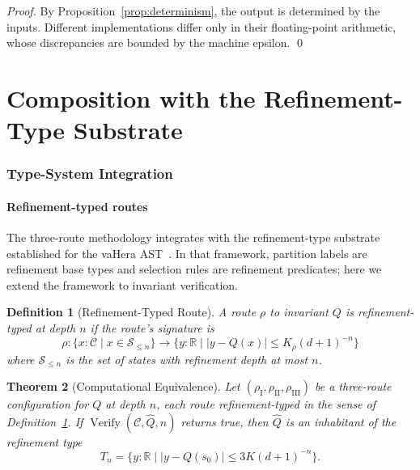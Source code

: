 \documentclass[twocolumn,11pt,a4paper]{article}
\newtheorem{theorem}{Theorem}[section]
\newtheorem{definition}[theorem]{Definition}
\DeclareMathOperator{\Verify}{Verify}
\newcommand{\Real}{\mathbb{R}}
\newcommand{\Inv}{Q}
\newcommand{\Route}{\rho}
\newcommand{\RouteI}{\rho_{\mathrm{I}}}
\newcommand{\RouteII}{\rho_{\mathrm{II}}}
\newcommand{\RouteIII}{\rho_{\mathrm{III}}}
\newcommand{\StateS}{\mathcal{S}}
\newcommand{\Depth}{n}
\newcommand{\Dim}{d}
\newcommand{\Tolb}{K}
\begin{document}
\begin{proof}
By Proposition~\ref{prop:determinism}, the output is determined by the inputs. Different implementations differ only in their floating-point arithmetic, whose discrepancies are bounded by the machine epsilon. \qed
\end{proof}

\part{Composition with the Refinement-Type Substrate}

\section{Type-System Integration}
\label{sec:type-integration}

\subsection{Refinement-typed routes}

The three-route methodology integrates with the refinement-type substrate established for the vaHera AST~\citep{sachikonye2026refinementtypes}. In that framework, partition labels are refinement base types and selection rules are refinement predicates; here we extend the framework to invariant verification.

\begin{definition}[Refinement-Typed Route]
\label{def:refined-route}
A route $\Route$ to invariant $\Inv$ is \emph{refinement-typed at depth $\Depth$} if the route's signature is
\[
\Route : \{x : \mathcal{C} \mid x \in \StateS_{\leq \Depth}\} \to \{y : \Real \mid |y - \Inv(x)| \leq \Tolb_\Route(\Dim+1)^{-\Depth}\}
\]
where $\StateS_{\leq \Depth}$ is the set of states with refinement depth at most $\Depth$.
\end{definition}

\begin{theorem}[Computational Equivalence]
\label{thm:type-compat}
Let $(\RouteI, \RouteII, \RouteIII)$ be a three-route configuration for $\Inv$ at depth $\Depth$, each route refinement-typed in the sense of Definition~\ref{def:refined-route}. If $\Verify(\mathcal{C}, \hat\Inv, \Depth)$ returns true, then $\hat\Inv$ is an inhabitant of the refinement type
\[
T_\Depth = \{y : \Real \mid |y - \Inv(s_0)| \leq 3\Tolb(\Dim+1)^{-\Depth}\}.
\]
\end{theorem}
\end{document}
